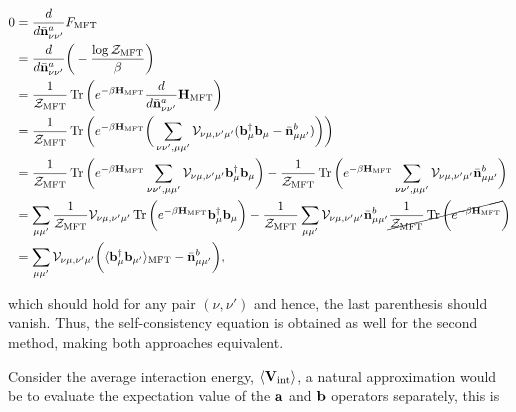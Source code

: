\documentclass{homework}
\begin{document}
\begin{itemize}
    \begin{equation}
        \begin{split}
            0 &= \frac{d}{d\bar{\bf n}_{\nu \nu'}^{a}} F_{\textnormal{MFT}} \\
            &= \frac{d}{d\bar{\bf n}_{\nu \nu'}^{a}} \bigg(-\frac{\log \mathcal{Z}_{\textnormal{MFT}}}{\beta}\bigg) \\
            &= \frac{1}{\mathcal{Z}_{\textnormal{MFT}}} \Tr \bigg(e^{-\beta {\bf H}_{\textnormal{MFT}}} \frac{d}{d\bar{\bf n}_{\nu \nu'}^{a}} {\bf H}_{\textnormal{MFT}} \bigg) \\
            &=\frac{1}{\mathcal{Z}_{\textnormal{MFT}}} \Tr \bigg(e^{-\beta {\bf H}_{\textnormal{MFT}}} \bigg(\sum_{\nu\nu', \mu\mu'} {\mathcal{V}}_{\nu\mu, \nu'\mu'} ({\bf b}_{\mu}^\dagger {\bf b}_\mu - \bar{\bf n}_{\mu\mu'}^{b})\bigg)\bigg) \\
            &= \frac{1}{\mathcal{Z}_{\textnormal{MFT}}} \Tr \bigg(e^{-\beta {\bf H}_{\textnormal{MFT}}} \sum_{\nu\nu', \mu\mu'} {\mathcal{V}}_{\nu\mu, \nu'\mu'} {\bf b}_{\mu}^\dagger {\bf b}_\mu \bigg) - \frac{1}{\mathcal{Z}_{\textnormal{MFT}}} \Tr \bigg(e^{-\beta {\bf H}_{\textnormal{MFT}}} \sum_{\nu\nu', \mu\mu'} {\mathcal{V}}_{\nu\mu, \nu'\mu'}\bar{\bf n}_{\mu\mu'}^{b}\bigg)
            \\
            &= \sum_{\mu \mu'} \frac{1}{\mathcal{Z}_{\textnormal{MFT}}} {\mathcal{V}}_{\nu\mu, \nu'\mu'} \Tr \bigg(e^{-\beta {\bf H}_{\textnormal{MFT}}} {\bf b}_{\mu}^\dagger {\bf b}_\mu \bigg) - \frac{1}{\mathcal{Z}_{\textnormal{MFT}}} \sum_{\mu \mu'} {\mathcal{V}}_{\nu\mu, \nu'\mu'} \bar{\bf n}_{\mu\mu'}^{b} \cancel{\frac{1}{\mathcal{Z}_{\textnormal{MFT}}} \Tr \bigg(e^{-\beta {\bf H}_{\textnormal{MFT}}}}\bigg)\\
            &= \sum_{\mu\mu'} {\mathcal{V}}_{\nu\mu, \nu'\mu'} \bigg(\langle {\bf b}_{\mu}^\dagger {\bf b}_{\mu'} \rangle_{\textnormal{MFT}} - \bar{\bf n}_{\mu\mu'}^{b}\bigg), 
        \end{split}
    \end{equation}
    
    which should hold for any pair $(\nu, \nu')$ and hence, the last parenthesis should vanish. Thus, the self-consistency equation is obtained as well for the second method, making both approaches equivalent. \\
\end{itemize}

Consider the average interaction energy, $\langle {\bf V}_{\textnormal{int}} \rangle$, a natural approximation would be to evaluate the expectation value of the ${\bf a}$ and ${\bf b}$ operators separately, this is 
\end{document}
